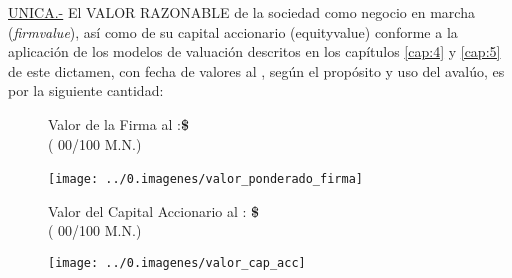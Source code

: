 \textcolor{principal}{\underline{UNICA.-}} El \textcolor{principal}{VALOR RAZONABLE} de la sociedad \textcolor{principal}{\empresaSolicitante} como negocio en marcha (\textit{\gls{firmvalue}}), as\'i como de su capital accionario (\gls{equityvalue}) conforme a la aplicaci\'on de los modelos de valuaci\'on descritos en los cap\'itulos \ref{cap:4} y \ref{cap:5}  de este dictamen, con fecha de valores al \fechaValores, seg\'un el prop\'osito y uso del aval\'uo, es por la siguiente cantidad:\\

\begin{figure}[H]
\centering
\textcolor{principal}{Valor de la Firma al \fechaValoresCorto:}\textbf{\$\valorFirma{} \monedaCode}\\

(\textcolor{secundario}{\valorFirmaLetra{} \moneda{} 00/100 M.N.})

\texttt{[image: ../0.imagenes/valor\_ponderado\_firma]}\

\textcolor{principal}{Valor del Capital Accionario al \fechaValoresCorto:} \textbf{\$\valorCapital{} \monedaCode}\\
(\textcolor{secundario}{\valorCapitalLetra{} \moneda{} 00/100 M.N.})\\
\end{figure}

\begin{figure}[H]
\centering
\texttt{[image: ../0.imagenes/valor\_cap\_acc]}

\end{figure}
\espacio{.5cm}

\vspace{2cm}